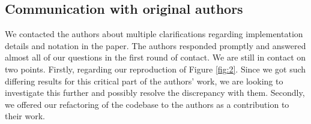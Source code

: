 \subsection{Communication with original authors}

We contacted the authors about multiple clarifications regarding implementation details and notation in the paper. The authors responded promptly and answered almost all of our questions in the first round of contact. We are still in contact on two points. Firstly, regarding our reproduction of Figure \ref{fig:2}. Since we got such differing results for this critical part of the authors' work, we are looking to investigate this further and possibly resolve the discrepancy with them. Secondly, we offered our refactoring of the codebase to the authors as a contribution to their work.
